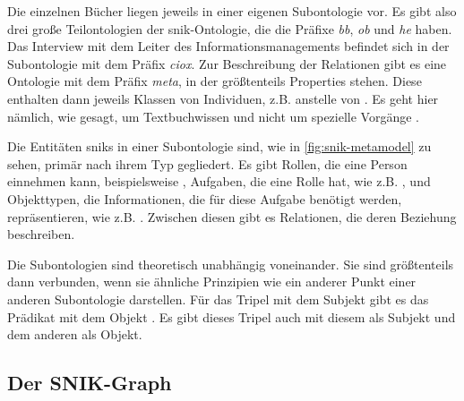 Die einzelnen Bücher liegen jeweils in einer eigenen Subontologie vor.
Es gibt also drei große Teilontologien der \ac{snik}-Ontologie, die die Präfixe \emph{bb}, \emph{ob} und \emph{he} haben.
Das Interview mit dem Leiter des Informationsmanagements befindet sich in der Subontologie mit dem Präfix \emph{ciox}.
Zur Beschreibung der Relationen gibt es eine Ontologie mit dem Präfix \emph{meta}, in der größtenteils Properties stehen.
Diese enthalten dann jeweils Klassen von Individuen, z.B.  anstelle von .
Es geht hier nämlich, wie gesagt, um Textbuchwissen und nicht um spezielle Vorgänge \citep{sniktec}.

Die Entitäten \ac{snik}s in einer Subontologie sind, wie in \cref{fig:snik-metamodel} zu sehen, primär nach ihrem Typ gegliedert.
Es gibt Rollen, die eine Person einnehmen kann, beispielsweise , Aufgaben, die eine Rolle hat, wie z.B. ,
und Objekttypen, die Informationen, die für diese Aufgabe benötigt werden, repräsentieren, wie z.B. .
Zwischen diesen gibt es Relationen, die deren Beziehung beschreiben.

Die Subontologien sind theoretisch unabhängig voneinander. Sie sind größtenteils dann verbunden,
wenn sie ähnliche Prinzipien wie ein anderer Punkt einer anderen Subontologie darstellen.
Für das Tripel mit dem Subjekt  gibt es das Prädikat  mit dem Objekt .
Es gibt dieses Tripel auch mit diesem als Subjekt und dem anderen als Objekt.

\subsection{Der SNIK-Graph}

